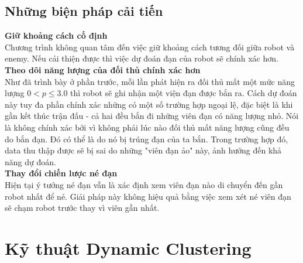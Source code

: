 \documentclass[14pt]{article}
\begin{document}
\subsection{Những biện pháp cải tiến}
{\bf Giữ khoảng cách cố định}\\
Chương trình không quan tâm đến việc giữ khoảng cách tương đối giữa robot và enemy. Nếu cải thiện được thì việc dự đoán đạn của robot sẽ chính xác hơn.\\
{\bf Theo dõi năng lượng của đối thủ chính xác hơn}\\
Như đã trình bày ở phần trước, mỗi lần phát hiện ra đối thủ mất một mức năng lượng $0 < p \leq 3.0$ thì robot sẽ ghi nhận một viện đạn được bắn ra. Cách dự đoán này tuy đa phần chính xác những có một số trường hợp ngoại lệ, đặc biệt là khi gần kết thúc trận đấu - cả hai đều bắn đi những viên đạn có năng lượng nhỏ. Nói là không chính xác bởi vì không phải lúc nào đối thủ mất năng lượng cũng đều do bắn đạn. Đó có thể là do nó bị trúng đạn của ta bắn. Trong trường hợp đó, data thu thập được sẽ bị sai do những "viên đạn ảo" này, ảnh hưởng đến khả năng dự đoán.\\
{\bf Thay đổi chiến lược né đạn}\\
Hiện tại ý tưởng né đạn vẫn là xác định xem viên đạn nào di chuyển đến gần robot nhất để né. Giải pháp này không hiệu quả bằng việc xem xét né viên đạn sẽ chạm robot trước thay vì viên gần nhất.


\section{Kỹ thuật Dynamic Clustering}
\end{document}
